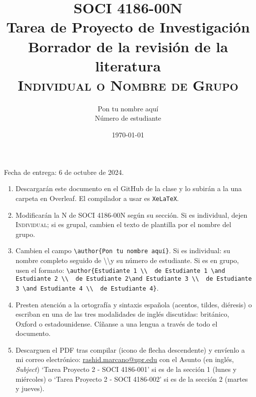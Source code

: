 \documentclass[11pt]{article}
\title{SOCI 4186-00N\\ Tarea de Proyecto de Investigación \textnumero 3 \\ Borrador de la revisión de la literatura \\ \textsc{Individual o Nombre de Grupo}}
\author{Pon tu nombre aquí \\ Número de estudiante}
\date{\today} %
\begin{document}
\singlespacing
\maketitle
Fecha de entrega: 6 de octubre de 2024.

\begin{enumerate}
    \item Descargarán este documento en el GitHub de la clase y lo subirán a la una carpeta en Overleaf. El compilador a usar es \texttt{XeLaTeX}.
    \item Modificarán la N de SOCI 4186-00N según su sección. Si es individual, dejen \textsc{Individual}; si es grupal, cambien el texto de plantilla por el nombre del grupo.
    \item Cambien el campo \texttt{\textbackslash author\{Pon tu nombre aquí\}}. Si es individual: su nombre completo seguido de \textbackslash\textbackslash y su número de estudiante. Si es en grupo, usen el formato: \texttt{\textbackslash author\{Estudiante 1 \textbackslash\textbackslash \ \textnumero\ de Estudiante 1 \textbackslash and Estudiante 2 \textbackslash\textbackslash \ \textnumero\ de Estudiante 2\textbackslash and Estudiante 3 \textbackslash\textbackslash \ \textnumero\ de Estudiante 3 \textbackslash and Estudiante 4 \textbackslash\textbackslash\ \textnumero\ de Estudiante 4\}}.
    \item Presten atención a la ortografía y sintaxis española (acentos, tildes, diéresis) o escriban en una de las tres modalidades de inglés discutidas: británico, Oxford o estadounidense. Cíñanse a una lengua a través de todo el documento.
    \item Descarguen el PDF tras compilar (icono de flecha descendente) y envíenlo a mi correo electrónico: \href{mailto:rashid.marcano@upr.edu}{rashid.marcano@upr.edu}%
    con el Asunto (en inglés, \textit{Subject}) `Tarea Proyecto 2 - SOCI 4186-001' si es de la sección 1 (lunes y miércoles) o `Tarea Proyecto 2 - SOCI 4186-002' si es de la sección 2 (martes y jueves).
\end{enumerate}
\end{document}
